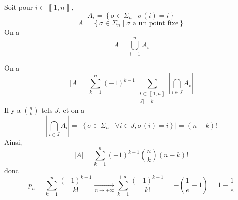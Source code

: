 \begin{solution}
    Soit pour $i\in\left\llbracket 1,n\right\rrbracket$, 
    \begin{equation}
        A_{i}=\left\{\sigma\in\Sigma_{n}\middle|\sigma(i)=i\right\}
    \end{equation}
    \begin{equation}
        A=\left\{\sigma\in\Sigma_{n}\middle|\sigma\text{ a un point fixe}\right\}
    \end{equation}
    On a 
    \begin{equation}
        A=\bigcup_{i=1}^{n}A_{i}
    \end{equation}

    On a 
    \begin{equation}
        \left\lvert A\right\rvert=\sum_{k=1}^{n}(-1)^{k-1}\sum_{\substack{J\subset\left\llbracket 1,n\right\rrbracket\\\left\lvert J\right\rvert=k}}\left\lvert\bigcap_{i\in J}A_{i}\right\rvert
    \end{equation}
    Il y a $\binom{n}{k}$ tels $J$, et on a 
    \begin{equation}
        \left\lvert\bigcap_{i\in J}A_{i}\right\rvert=\left\lvert\left\{\sigma\in\Sigma_{n}\middle|\forall i\in J,\sigma(i)=i\right\}\right\rvert=(n-k)!
    \end{equation}
    Ainsi, 
    \begin{equation}
        \left\lvert A\right\rvert=\sum_{k=1}^{n}(-1)^{k-1}\binom{n}{k}(n-k)!
    \end{equation}
    donc 
    \begin{equation}
        \boxed{p_{n}=\sum_{k=1}^{n}\frac{(-1)^{k-1}}{k!}\xrightarrow[n\to+\infty]{}\sum_{k=1}^{+\infty}\frac{(-1)^{k-1}}{k!}=-\left(\frac{1}{e}-1\right)=1-\frac{1}{e}}
    \end{equation}
\end{solution}
